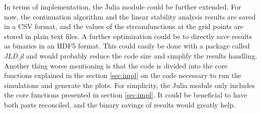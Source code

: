 In terms of implementation, the Julia module could be further extended. For
now, the continuation algorithm and the linear stability analysis results are
saved in a CSV format, and the values of the streamfunctions at the grid points
are stored in plain text files. A further optimization could be to directly
save results as binaries in an HDF5 format. This could easily be done with a
package called \emph{JLD.jl} and would probably reduce the code size and
simplify the results handling. Another thing worse mentioning is that the code
is divided into the core functions explained in the section \ref{sec:impl} on
the code necessary to run the simulations and generate the plots. For
simplicity, the Julia module only includes the core functions presented in
section \ref{sec:impl}. It could be beneficial to have both parts reconciled,
and the binary savings of results would greatly help.


